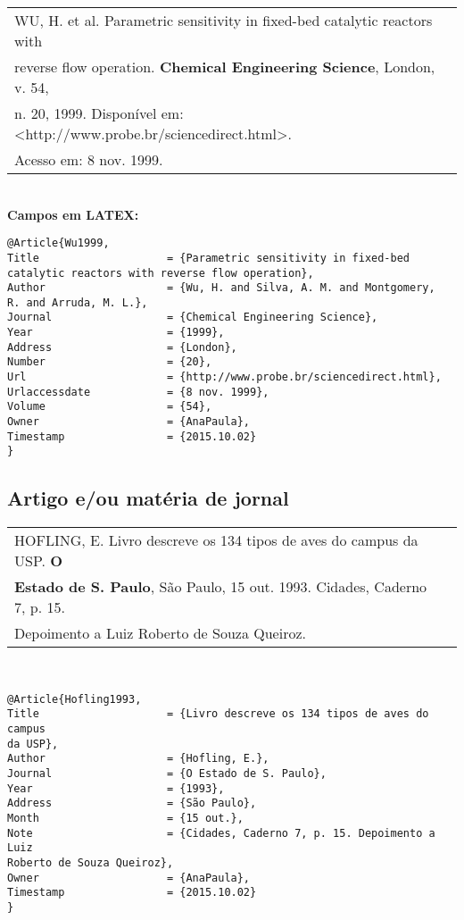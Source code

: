\begin{tabular}{|l|c|} \hline
WU, H. et al. Parametric sensitivity in fixed-bed catalytic reactors with \\
reverse flow operation. \textbf{Chemical Engineering Science}, London, v. 54,\\
n. 20, 1999. Disponível em: <http://www.probe.br/sciencedirect.html>. \\Acesso em: 8 nov. 1999. \\\hline
\end{tabular} \\

\textbf{Campos em LATEX:} 

\begin{verbatim}
@Article{Wu1999,
Title                    = {Parametric sensitivity in fixed-bed 
catalytic reactors with reverse flow operation},
Author                   = {Wu, H. and Silva, A. M. and Montgomery, 
R. and Arruda, M. L.},
Journal                  = {Chemical Engineering Science},
Year                     = {1999},
Address                  = {London},
Number                   = {20},
Url                      = {http://www.probe.br/sciencedirect.html},
Urlaccessdate            = {8 nov. 1999},
Volume                   = {54},
Owner                    = {AnaPaula},
Timestamp                = {2015.10.02}
}
\end{verbatim}
\subsection{Artigo e/ou matéria de jornal}

\begin{tabular}{|l|c|} \hline
HOFLING, E. Livro descreve os 134 tipos de aves do campus da USP. \textbf{O} \\ \textbf{Estado de S. Paulo}, São Paulo, 15 out. 1993. Cidades, Caderno 7, p. 15. \\Depoimento a Luiz Roberto de Souza Queiroz.	\\\hline
\end{tabular} \\

\begin{verbatim}
@Article{Hofling1993,
Title                    = {Livro descreve os 134 tipos de aves do campus
da USP},
Author                   = {Hofling, E.},
Journal                  = {O Estado de S. Paulo},
Year                     = {1993},
Address                  = {São Paulo},
Month                    = {15 out.},
Note                     = {Cidades, Caderno 7, p. 15. Depoimento a Luiz 
Roberto de Souza Queiroz},
Owner                    = {AnaPaula},
Timestamp                = {2015.10.02}
}
\end{verbatim}

